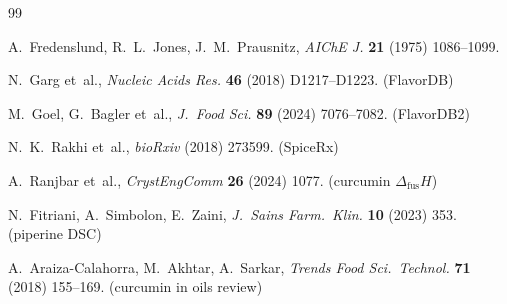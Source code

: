 \documentclass[twocolumn,10pt]{article}
\begin{document}
\begin{thebibliography}{99}

A.~Fredenslund, R.~L.~Jones, J.~M.~Prausnitz,
\textit{AIChE J.} \textbf{21} (1975) 1086--1099.

N.~Garg et~al.,
\textit{Nucleic Acids Res.} \textbf{46} (2018) D1217--D1223.
(FlavorDB)

M.~Goel, G.~Bagler et~al.,
\textit{J.\ Food Sci.} \textbf{89} (2024) 7076--7082.
(FlavorDB2)

N.~K.~Rakhi et~al.,
\textit{bioRxiv} (2018) 273599.
(SpiceRx)

A.~Ranjbar et~al.,
\textit{CrystEngComm} \textbf{26} (2024) 1077.
(curcumin $\Delta_{\mathrm{fus}}H$)

N.~Fitriani, A.~Simbolon, E.~Zaini,
\textit{J.\ Sains Farm.\ Klin.} \textbf{10} (2023) 353.
(piperine DSC)

A.~Araiza-Calahorra, M.~Akhtar, A.~Sarkar,
\textit{Trends Food Sci.\ Technol.} \textbf{71} (2018) 155--169.
(curcumin in oils review)

\end{thebibliography}
\end{document}
